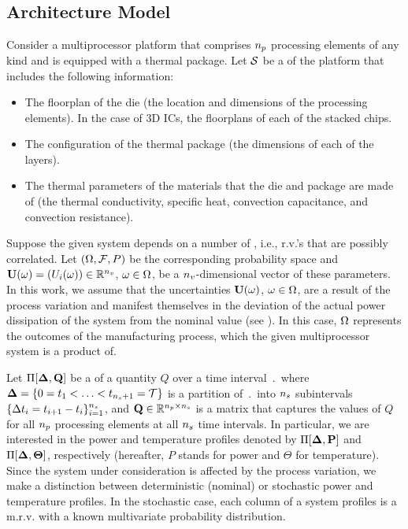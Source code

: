 \subsection{Architecture Model}  
Consider a multiprocessor platform that comprises ${n_p}$ processing elements of any kind and is equipped with a thermal package. Let $\mathcal{S}$ be a  of the platform that includes the following information:
\begin{itemize}
  \item The floorplan of the die (the location and dimensions of the processing elements). In the case of 3D ICs, the floorplans of each of the stacked chips.
  \item The configuration of the thermal package (the dimensions of each of the layers).
  \item The thermal parameters of the materials that the die and package are made of (the thermal conductivity, specific heat, convection capacitance, and convection resistance).
\end{itemize}

Suppose the given system depends on a number of , i.e., r.v.'s that are possibly correlated. Let $(\Omega, \mathcal{F}, P)$ be the corresponding probability space and $\vU(\o) = \vec{\param_i(\o)} \in \real^\vars$, $\omega \in \Omega$, be a ${n_v}$-dimensional vector of these parameters. In this work, we assume that the uncertainties $\vU(\o)$, $\omega \in \Omega$, are a result of the process variation and manifest themselves in the deviation of the actual power dissipation of the system from the nominal value (see ). In this case, $\Omega$ represents the outcomes of the manufacturing process, which the given multiprocessor system is a product of.

Let $\prof{\m{Q}}$ be a  of a quantity $Q$ over a time interval $\period$ where $\boldsymbol{\Delta} = \{ 0 = t_1 < \dotsc < t_{{n_s} + 1} = \mathcal{T} \}$ is a partition of $\period$ into ${n_s}$ subintervals $\{ \Delta t_i = t_{i+1} - t_i \}_{i = 1}^{{n_s}}$, and $\m{Q} \in \real^{\cores \times \steps}$ is a matrix that captures the values of $Q$ for all ${n_p}$ processing elements at all ${n_s}$ time intervals. In particular, we are interested in the power and temperature profiles denoted by $\prof{\mP}$ and $\Pi[\boldsymbol{\Delta}, {\boldsymbol\Theta}]$, respectively (hereafter, $P$ stands for power and $\Theta$ for temperature). Since the system under consideration is affected by the process variation, we make a distinction between deterministic (nominal) or stochastic power and temperature profiles. In the stochastic case, each column of a system profiles is a m.r.v. with a known multivariate probability distribution.
